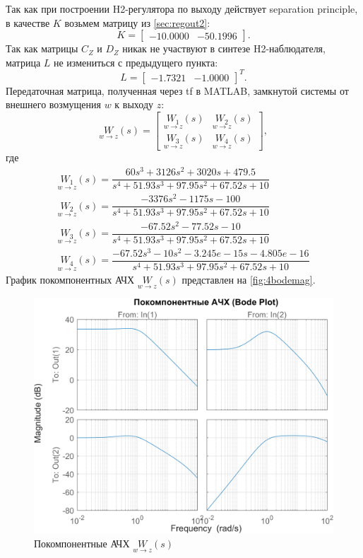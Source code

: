 Так как при построении H2-регулятора по выходу действует separation principle,
в качестве $K$ возьмем матрицу из \autoref{sec:regout2}:
\begin{equation*}
    K=\begin{bmatrix}
        -10.0000&-50.1996
    \end{bmatrix}.
\end{equation*}
Так как матрицы $C_Z$ и $D_Z$ никак не участвуют в синтезе H2-наблюдателя,
матрица $L$ не измениться с предыдущего пункта:
\begin{equation*}
    L=\begin{bmatrix}
        -1.7321 &
        -1.0000
    \end{bmatrix}^T.
\end{equation*}
Передаточная матрица, полученная через tf в MATLAB, замкнутой системы от внешнего возмущения $w$ к выходу $z$:
\begin{equation*}
    \underset{w\rightarrow z}{W}(s)=\begin{bmatrix}
        \underset{w\rightarrow z}{W_1}(s) & \underset{w\rightarrow z}{W_2}(s)\\
        \underset{w\rightarrow z}{W_3}(s) & \underset{w\rightarrow z}{W_4}(s)
    \end{bmatrix},
\end{equation*}
где
\begin{gather*}
    \underset{w\rightarrow z}{W_1}(s)=\dfrac{ 60 s^3 + 3126 s^2 + 3020 s + 479.5}{s^4 + 51.93 s^3 + 97.95 s^2 + 67.52 s + 10}\\
    \underset{w\rightarrow z}{W_2}(s)=\dfrac{ -3376 s^2 - 1175 s - 100}{s^4 + 51.93 s^3 + 97.95 s^2 + 67.52 s + 10}\\
    \underset{w\rightarrow z}{W_3}(s)=\dfrac{  -67.52 s^2 - 77.52 s - 10}{s^4 + 51.93 s^3 + 97.95 s^2 + 67.52 s + 10}\\
    \underset{w\rightarrow z}{W_4}(s)=\dfrac{  -67.52 s^3 - 10 s^2 - 3.245e-15 s - 4.805e-16}{s^4 + 51.93 s^3 + 97.95 s^2 + 67.52 s + 10}
\end{gather*}
График покомпонентных АЧХ $\underset{w\rightarrow z}{W}(s)$ представлен на \autoref{fig:4bodemag}.
\begin{figure}[H]
    \centering
    \includegraphics[width=0.7\linewidth]{figs/4_bodemag.png}
    \caption{Покомпонентные АЧХ $\underset{w\rightarrow z}{W}(s)$}
    \label{fig:4bodemag}
\end{figure}
